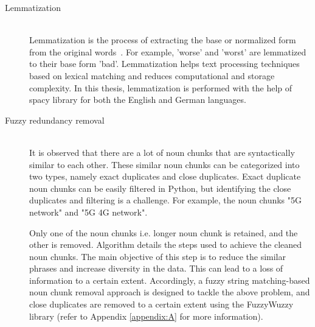 \begin{description}
 	
 	\item[Lemmatization] \hfill \\  Lemmatization is the process of extracting the base or normalized form from the original words~\cite{plisson2004rule}. For example, 'worse' and 'worst' are lemmatized to their base form 'bad'. Lemmatization helps text processing techniques based on lexical matching and reduces computational and storage complexity. In this thesis, lemmatization is performed with the help of spacy library for both the English and German languages.
 	
 	
 	\item[Fuzzy redundancy removal] \hfill \\  It is observed that there are a lot of noun chunks that are syntactically similar to each other. These similar noun chunks can be categorized into two types, namely exact duplicates and close duplicates. Exact duplicate noun chunks can be easily filtered in Python, but identifying the close duplicates and filtering is a challenge. For example, the noun chunks "5G network" and "5G 4G network". 
 	
 	Only one of the noun chunks i.e. longer noun chunk is retained, and the other is removed. Algorithm  details the steps used to achieve the cleaned noun chunks. The main objective of this step is to reduce the similar phrases and increase diversity in the data. This can lead to a loss of information to a certain extent. Accordingly, a fuzzy string matching-based noun chunk removal approach is designed to tackle the above problem, and close duplicates are removed to a certain extent using the FuzzyWuzzy library (refer to Appendix \ref{appendix:A} for more information).
 	
 	
 \end{description}

